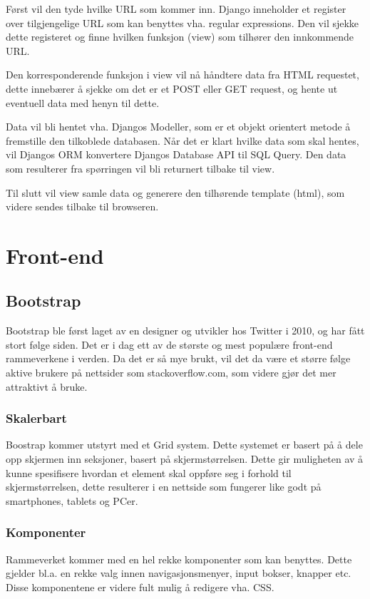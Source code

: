 Først vil den tyde hvilke URL som kommer inn. Django inneholder et register over tilgjengelige URL som kan benyttes vha. regular expressions. Den vil sjekke dette registeret og finne hvilken funksjon (view) som tilhører den innkommende URL.

Den korresponderende funksjon i view vil nå håndtere data fra HTML requestet, dette innebærer å sjekke om det er et POST eller GET request, og hente ut eventuell data med henyn til dette. 

Data vil bli hentet vha. Djangos Modeller, som er et objekt orientert metode å fremstille den tilkoblede databasen. Når det er klart hvilke data som skal hentes, vil Djangos ORM konvertere Djangos Database API til SQL Query. Den data som resulterer fra spørringen vil bli returnert tilbake til view.

Til slutt vil view samle data og generere den tilhørende template (html), som videre sendes tilbake til browseren.



\section{Front-end}
\subsection{Bootstrap}
Bootstrap ble først laget av en designer og utvikler hos Twitter i 2010, og har fått stort følge siden. Det er i dag ett av de største og mest populære front-end rammeverkene i verden. Da det er så mye brukt, vil det da være et større følge aktive brukere på nettsider som stackoverflow.com, som videre gjør det mer attraktivt å bruke.

\subsubsection*{Skalerbart}
Boostrap kommer utstyrt med et Grid system. Dette systemet er basert på å dele opp skjermen inn seksjoner, basert på skjermstørrelsen. Dette gir muligheten av å kunne spesifisere hvordan et element skal oppføre seg i forhold til skjermstørrelsen, dette resulterer i en nettside som fungerer like godt på smartphones, tablets og PCer.

\subsubsection*{Komponenter}
Rammeverket kommer med en hel rekke komponenter som kan benyttes.  Dette gjelder bl.a. en rekke valg innen navigasjonsmenyer, input bokser, knapper etc. Disse komponentene er videre fult mulig å redigere vha. CSS.


